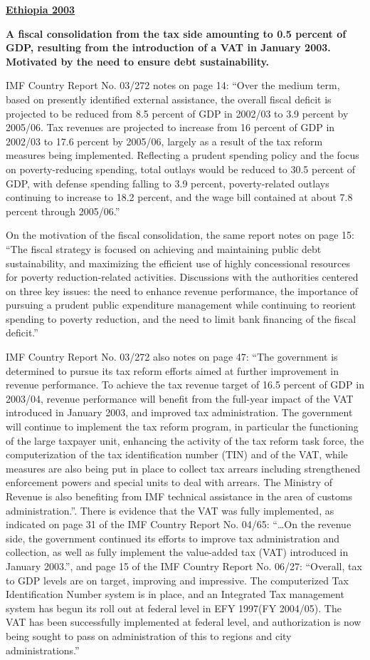 \textbf{\underline{Ethiopia 2003}}

\textbf{A fiscal consolidation from the tax side amounting to 0.5 percent of GDP, resulting from the introduction of a VAT in January 2003. Motivated by the need to ensure debt sustainability.} 

IMF Country Report No. 03/272 notes on page 14: “Over the medium term, based on presently identified external assistance, the overall fiscal deficit is projected to be reduced from 8.5 percent of GDP in 2002/03 to 3.9 percent by 2005/06. Tax revenues are projected to increase from 16 percent of GDP in 2002/03 to 17.6 percent by 2005/06, largely as a result of the tax reform measures being implemented. Reflecting a prudent spending policy and the focus on poverty-reducing spending, total outlays would be reduced to 30.5 percent of GDP, with defense spending falling to 3.9 percent, poverty-related outlays continuing to increase to 18.2 percent, and the wage bill contained at about 7.8 percent through 2005/06.”

On the motivation of the fiscal consolidation, the same report notes on page 15: “The fiscal strategy is focused on achieving and maintaining public debt sustainability, and maximizing the efficient use of highly concessional resources for poverty reduction-related activities. Discussions with the authorities centered on three key issues: the need to enhance revenue performance, the importance of pursuing a prudent public expenditure management while continuing to reorient spending to poverty reduction, and the need to limit bank financing of the fiscal deficit.”

IMF Country Report No. 03/272 also notes on page 47: “The government is determined to pursue its tax reform efforts aimed at further improvement in revenue performance. To achieve the tax revenue target of 16.5 percent of GDP in 2003/04, revenue performance will benefit from the full-year impact of the VAT introduced in January 2003, and improved tax administration. The government will continue to implement the tax reform program, in particular the functioning of the large taxpayer unit, enhancing the activity of the tax reform task force, the computerization of the tax identification number (TIN) and of the VAT, while measures are also being put in place to collect tax arrears including strengthened enforcement powers and special units to deal with arrears. The Ministry of Revenue is also benefiting from IMF technical assistance in the area of customs administration.”. There is evidence that the VAT was fully implemented, as indicated on page 31 of the IMF Country Report No. 04/65: “…On the revenue side, the government continued its efforts to improve tax administration and collection, as well as fully implement the value-added tax (VAT) introduced in January 2003.”, and page 15 of the IMF Country Report No. 06/27: “Overall, tax to GDP levels are on target, improving and impressive. The computerized Tax Identification Number system is in place, and an Integrated Tax management system has begun its roll out at federal level in EFY 1997(FY 2004/05). The VAT has been successfully implemented at federal level, and authorization is now being sought to pass on administration of this to regions and city administrations.”

